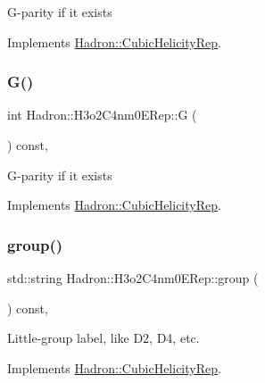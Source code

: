 G-\/parity if it exists 

Implements \mbox{\hyperlink{structHadron_1_1CubicHelicityRep_a50689f42be1e6170aa8cf6ad0597018b}{Hadron\+::\+Cubic\+Helicity\+Rep}}.

\mbox{\label{structHadron_1_1H3o2C4nm0ERep_a0dbed874e65f17f90f2b09c97b54f679}} 
\subsubsection{\texorpdfstring{G()}{G()}\hspace{0.1cm}{\footnotesize\ttfamily [2/2]}}
{\footnotesize\ttfamily int Hadron\+::\+H3o2\+C4nm0\+E\+Rep\+::G (\begin{DoxyParamCaption}{ }\end{DoxyParamCaption}) const\hspace{0.3cm}{\ttfamily [inline]}, {\ttfamily [virtual]}}

G-\/parity if it exists 

Implements \mbox{\hyperlink{structHadron_1_1CubicHelicityRep_a50689f42be1e6170aa8cf6ad0597018b}{Hadron\+::\+Cubic\+Helicity\+Rep}}.

\mbox{\label{structHadron_1_1H3o2C4nm0ERep_a2fe0c5a9224b4ed20f8e294547091975}} 
\subsubsection{\texorpdfstring{group()}{group()}\hspace{0.1cm}{\footnotesize\ttfamily [1/2]}}
{\footnotesize\ttfamily std\+::string Hadron\+::\+H3o2\+C4nm0\+E\+Rep\+::group (\begin{DoxyParamCaption}{ }\end{DoxyParamCaption}) const\hspace{0.3cm}{\ttfamily [inline]}, {\ttfamily [virtual]}}

Little-\/group label, like D2, D4, etc. 

Implements \mbox{\hyperlink{structHadron_1_1CubicHelicityRep_a101a7d76cd8ccdad0f272db44b766113}{Hadron\+::\+Cubic\+Helicity\+Rep}}.

\mbox{\label{structHadron_1_1H3o2C4nm0ERep_a2fe0c5a9224b4ed20f8e294547091975}} 
